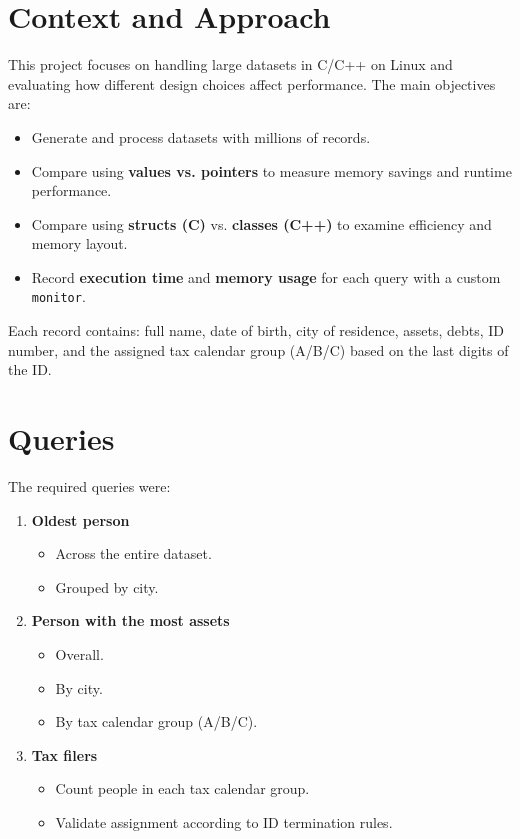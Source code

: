 \documentclass[11pt,letterpaper,oneside]{article}
\begin{document}


\tableofcontents

\iftotalfigures
    \listoffigures
\fi

\listoftables

\clearpage


\section{Context and Approach}

This project focuses on handling large datasets in C/C++ on Linux and evaluating
how different design choices affect performance. The main objectives are:
\begin{itemize}
    \item Generate and process datasets with millions of records.
    \item Compare using \textbf{values vs. pointers} to measure memory savings
    and runtime performance.
    \item Compare using \textbf{structs (C)} vs. \textbf{classes (C++)} to
    examine efficiency and memory layout.
    \item Record \textbf{execution time} and \textbf{memory usage} for each
    query with a custom \texttt{monitor}.
\end{itemize}

Each record contains: full name, date of birth, city of residence, assets,
debts, ID number, and the assigned tax calendar group (A/B/C) based on the last
digits of the ID.

\section{Queries}

The required queries were:
\begin{enumerate}
    \item \textbf{Oldest person}
    \begin{itemize}
        \item Across the entire dataset.
        \item Grouped by city.
    \end{itemize}
    \item \textbf{Person with the most assets}
    \begin{itemize}
        \item Overall.
        \item By city.
        \item By tax calendar group (A/B/C).
    \end{itemize}
    \item \textbf{Tax filers}
    \begin{itemize}
        \item Count people in each tax calendar group.
        \item Validate assignment according to ID termination rules.
    \end{itemize}
\end{enumerate}
\end{document}
